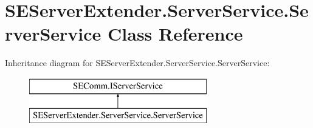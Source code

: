 \hypertarget{class_s_e_server_extender_1_1_server_service_1_1_server_service}{}\section{S\+E\+Server\+Extender.\+Server\+Service.\+Server\+Service Class Reference}
\label{class_s_e_server_extender_1_1_server_service_1_1_server_service}
Inheritance diagram for S\+E\+Server\+Extender.\+Server\+Service.\+Server\+Service\+:\begin{figure}[H]
\begin{center}
\leavevmode
\includegraphics[height=2.000000cm]{class_s_e_server_extender_1_1_server_service_1_1_server_service}
\end{center}
\end{figure}
